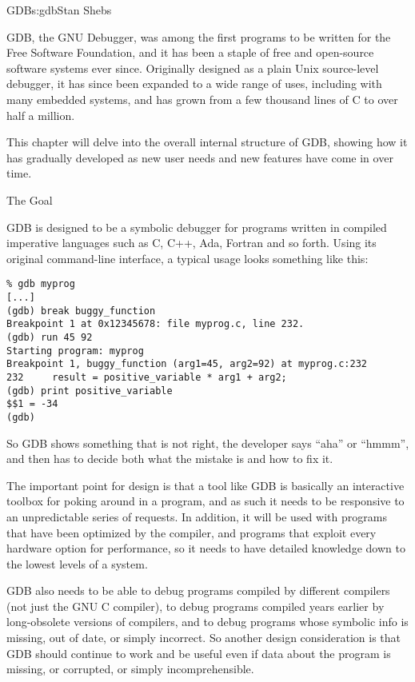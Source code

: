 \begin{aosachapter}{GDB}{s:gdb}{Stan Shebs}

GDB, the GNU Debugger, was among the first programs to be written for
the Free Software Foundation, and it has been a staple of free and
open-source software systems ever since.  Originally designed as a
plain Unix source-level debugger, it has since been expanded to a wide
range of uses, including with many embedded systems, and has grown from
a few thousand lines of C to over half a million.

This chapter will delve into the overall internal structure of GDB,
showing how it has gradually developed as new user needs and new
features have come in over time.

\begin{aosasect1}{The Goal}

GDB is designed to be a symbolic debugger for programs written in
compiled imperative languages such as C, C++, Ada, Fortran and so
forth.  Using its original command-line interface, a typical usage
looks something like this:

\begin{verbatim}
% gdb myprog
[...]
(gdb) break buggy_function
Breakpoint 1 at 0x12345678: file myprog.c, line 232.
(gdb) run 45 92
Starting program: myprog
Breakpoint 1, buggy_function (arg1=45, arg2=92) at myprog.c:232
232     result = positive_variable * arg1 + arg2;
(gdb) print positive_variable
$$1 = -34
(gdb)
\end{verbatim}

So GDB shows something that is not right, the developer says ``aha''
or ``hmmm'', and then has to decide both what the mistake is and how
to fix it.

The important point for design is that a tool like GDB is basically an
interactive toolbox for poking around in a program, and as such it
needs to be responsive to an unpredictable series of requests.  In
addition, it will be used with programs that have been optimized by
the compiler, and programs that exploit every hardware option for
performance, so it needs to have detailed knowledge down to the lowest
levels of a system.

GDB also needs to be able to debug programs compiled by different
compilers (not just the GNU C compiler), to debug programs compiled
years earlier by long-obsolete versions of compilers, and to debug
programs whose symbolic info is missing, out of date, or simply
incorrect.  So another design consideration is that GDB should
continue to work and be useful even if data about the program is
missing, or corrupted, or simply incomprehensible.


\end{aosasect1}
\end{aosachapter}
